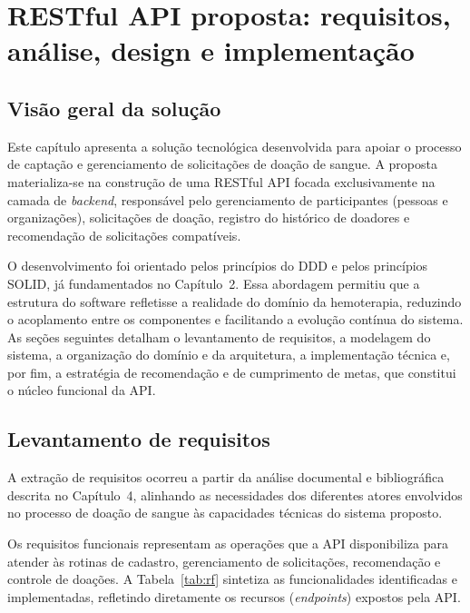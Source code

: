 \chapter{RESTful API proposta: requisitos, análise, design e implementação}

\section{Visão geral da solução}

Este capítulo apresenta a solução tecnológica desenvolvida para apoiar o processo de captação e gerenciamento de solicitações de doação de sangue. A proposta materializa-se na construção de uma RESTful API focada exclusivamente na camada de \textit{backend}, responsável pelo gerenciamento de participantes (pessoas e organizações), solicitações de doação, registro do histórico de doadores e recomendação de solicitações compatíveis.

O desenvolvimento foi orientado pelos princípios do DDD e pelos princípios SOLID, já fundamentados no Capítulo~2. Essa abordagem permitiu que a estrutura do software refletisse a realidade do domínio da hemoterapia, reduzindo o acoplamento entre os componentes e facilitando a evolução contínua do sistema. As seções seguintes detalham o levantamento de requisitos, a modelagem do sistema, a organização do domínio e da arquitetura, a implementação técnica e, por fim, a estratégia de recomendação e de cumprimento de metas, que constitui o núcleo funcional da API.

\section{Levantamento de requisitos}

A extração de requisitos ocorreu a partir da análise documental e bibliográfica descrita no Capítulo~4, alinhando as necessidades dos diferentes atores envolvidos no processo de doação de sangue às capacidades técnicas do sistema proposto.

Os requisitos funcionais representam as operações que a API disponibiliza para atender às rotinas de cadastro, gerenciamento de solicitações, recomendação e controle de doações. A Tabela~\ref{tab:rf} sintetiza as funcionalidades identificadas e implementadas, refletindo diretamente os recursos (\textit{endpoints}) expostos pela API.

